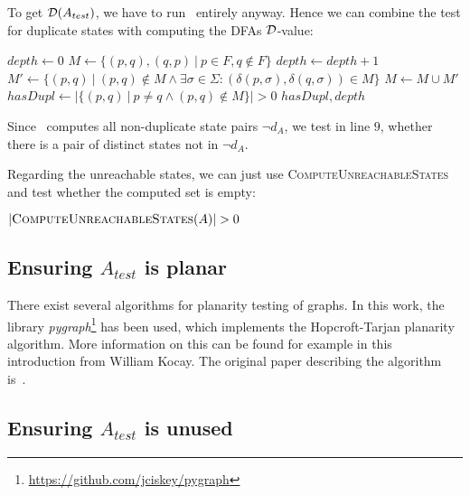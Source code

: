 To get $\mathcal{D}(A_{test})$, we have to run \MinMark\ entirely anyway. Hence we can combine the test for duplicate states with computing the DFAs $\mathcal{D}$-value:
\vspace{0.2cm}
\begin{algorithmic}[1]
		\State $depth \gets 0$
		\State $M \gets \{ (p,q), (q,p)\ |\ p \in F, q \notin F \}$
		\Do
			\State $depth \gets depth + 1$
			\State $M' \gets \{ (p,q)\ |\ (p,q) \notin M \land \exists \sigma \in \Sigma \colon (\delta(p,\sigma), \delta(q,\sigma)) \in M \}$
			\State $M \gets M \cup M'$
		\State $hasDupl \gets | \{ (p,q)\ |\ p \neq q \land (p,q) \notin M \} | > 0$
		\State \Return $hasDupl, depth$
	\EndFunction
\end{algorithmic}
\vspace{0.2cm}
Since \MinMark\ computes all non-duplicate state pairs $\neg d_A$, we test in line $9$, whether there is a pair of distinct states not in $\neg d_A$.

Regarding the unreachable states, we can just use \textsc{ComputeUnreachableStates} and test whether the computed set is empty:
\vspace{0.2cm}
\begin{algorithmic}[1]
	\State \Return $|\textsc{ComputeUnreachableStates}(A)| > 0$
	\EndFunction
\end{algorithmic}

\subsection{Ensuring $A_{test}$ is planar}

There exist several algorithms for planarity testing of graphs. In this work, the library \emph{pygraph}\footnote{\url{https://github.com/jciskey/pygraph}} has been used, which implements the Hopcroft-Tarjan planarity algorithm. More information on this can be found for example in this~\cite{kocay93} introduction from William Kocay. The original paper describing the algorithm is~\cite{hopcroft74}.

\subsection{Ensuring $A_{test}$ is unused}

